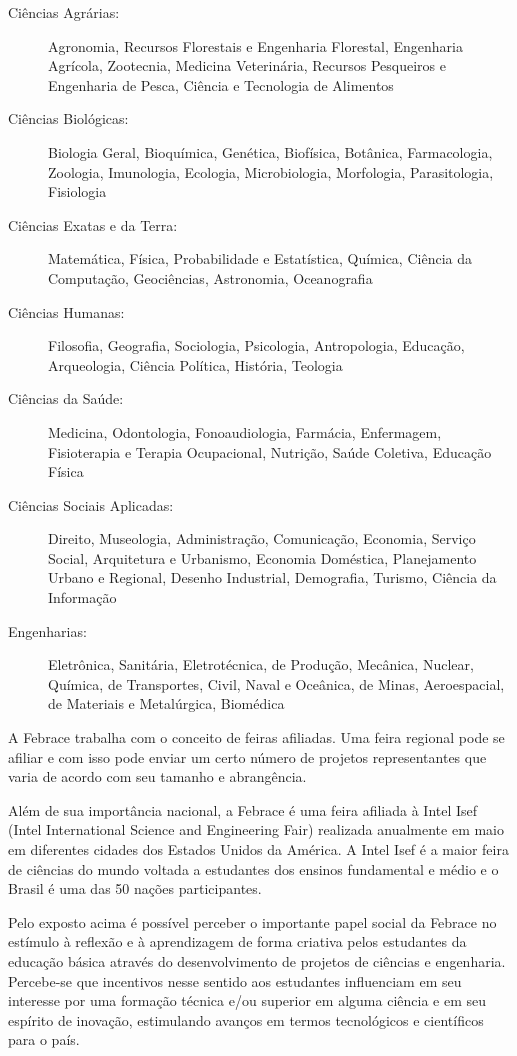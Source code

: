 \begin{description}
    \item[Ciências Agrárias:] 
        Agronomia, Recursos Florestais e Engenharia Florestal, Engenharia Agrícola, Zootecnia, Medicina Veterinária, Recursos Pesqueiros e Engenharia de Pesca, Ciência e Tecnologia de Alimentos
    \item[Ciências Biológicas:] 
        Biologia Geral, Bioquímica, Genética, Biofísica, Botânica, Farmacologia, Zoologia, Imunologia, Ecologia, Microbiologia, Morfologia, Parasitologia, Fisiologia 	 
    \item[Ciências Exatas e da Terra:] 
        Matemática, Física, Probabilidade e Estatística, Química, Ciência da Computação, Geociências, Astronomia, Oceanografia 
    \item[Ciências Humanas:] 
        Filosofia, Geografia, Sociologia, Psicologia, Antropologia, Educação, Arqueologia, Ciência Política, História, Teologia 
    \item[Ciências da Saúde:] 
        Medicina, Odontologia, Fonoaudiologia, Farmácia, Enfermagem, Fisioterapia e Terapia Ocupacional, Nutrição, Saúde Coletiva, Educação Física
    \item[Ciências Sociais Aplicadas:] 
        Direito, Museologia, Administração, Comunicação, Economia, Serviço Social, Arquitetura e Urbanismo, Economia Doméstica, Planejamento Urbano e Regional, Desenho Industrial, Demografia, Turismo, Ciência da Informação  	 
    \item[Engenharias:] 
        Eletrônica, Sanitária, Eletrotécnica, de Produção, Mecânica, Nuclear, Química, de Transportes, Civil, Naval e Oceânica, de Minas, Aeroespacial, de Materiais e Metalúrgica, Biomédica 
\end{description}

A Febrace trabalha com o conceito de feiras afiliadas. Uma feira regional pode se afiliar e com isso pode enviar um certo número de projetos representantes que varia de acordo com seu tamanho e abrangência.

Além de sua importância nacional, a Febrace é uma feira afiliada à Intel Isef (Intel International Science and Engineering Fair) realizada anualmente em maio em diferentes cidades dos Estados Unidos da América. A Intel Isef é a maior feira de ciências do mundo voltada a estudantes dos ensinos fundamental e médio e o Brasil é uma das 50 nações participantes.

Pelo exposto acima é possível perceber o importante papel social da Febrace no estímulo à reflexão e à aprendizagem de forma criativa pelos estudantes da educação básica através do desenvolvimento de projetos de ciências e engenharia. Percebe-se que incentivos nesse sentido aos estudantes influenciam em seu interesse por uma formação técnica e/ou superior em alguma ciência e em seu espírito de inovação, estimulando avanços em termos tecnológicos e científicos para o país.

